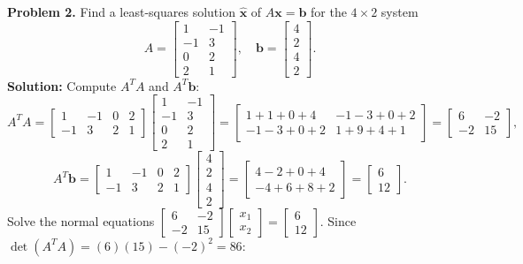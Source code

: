 \documentclass[11pt, letterpaper]{article}
\theoremstyle{definition}
\theoremstyle{remark}
\begin{document}
\textbf{Problem 2.} Find a least-squares solution $\hat{\mathbf{x}}$ of $A\mathbf{x} = \mathbf{b}$ for the $4 \times 2$ system
\[
A = \begin{bmatrix} 1 & -1 \\ -1 & 3 \\ 0 & 2 \\ 2 & 1 \end{bmatrix}, \quad \mathbf{b} = \begin{bmatrix} 4 \\ 2 \\ 4 \\ 2 \end{bmatrix}.
\]
\textbf{Solution:} Compute $A^T A$ and $A^T \mathbf{b}$:
\[
A^T A = \begin{bmatrix} 1 & -1 & 0 & 2 \\ -1 & 3 & 2 & 1 \end{bmatrix} \begin{bmatrix} 1 & -1 \\ -1 & 3 \\ 0 & 2 \\ 2 & 1 \end{bmatrix} = \begin{bmatrix} 1+1+0+4 & -1-3+0+2 \\ -1-3+0+2 & 1+9+4+1 \end{bmatrix} = \begin{bmatrix} 6 & -2 \\ -2 & 15 \end{bmatrix},
\]
\[
A^T \mathbf{b} = \begin{bmatrix} 1 & -1 & 0 & 2 \\ -1 & 3 & 2 & 1 \end{bmatrix} \begin{bmatrix} 4 \\ 2 \\ 4 \\ 2 \end{bmatrix} = \begin{bmatrix} 4-2+0+4 \\ -4+6+8+2 \end{bmatrix} = \begin{bmatrix} 6 \\ 12 \end{bmatrix}.
\]
Solve the normal equations $\begin{bmatrix} 6 & -2 \\ -2 & 15 \end{bmatrix} \begin{bmatrix} x_1 \\ x_2 \end{bmatrix} = \begin{bmatrix} 6 \\ 12 \end{bmatrix}$. Since $\det(A^T A) = (6)(15) - (-2)^2 = 86$:
\end{document}
